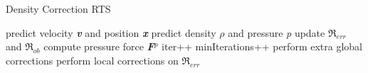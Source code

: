 \documentclass[../../main.tex]{subfiles}
\begin{document}
\begin{algorithm}[h]
    \caption{Density Correction RTS}
    \label{alg:rts:correction}
    \begin{algorithmic}[1]
            \State predict velocity \textbf{\textit{v}} and position \textbf{\textit{x}}
            \State predict density $\rho$ and pressure \textit{p}
                \State update $\Re_{err}$ and $\Re_{ob}$
            \EndIf
                \State compute pressure force \textbf{\textit{F}}$^p$
            \EndIf
            \State iter++
                \State minIterations++
                    \State perform extra global corrections
                \Else
                    \State perform local corrections on $\Re_{err}$
                \EndIf
            \EndIf
        \EndWhile
   \end{algorithmic}
\end{algorithm}
\end{document}
